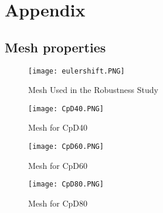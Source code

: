 \appendix
\chapter{Appendix}
\section{Mesh properties}
	\begin{figure}[htp]
		\centering
		\texttt{[image: eulershift.PNG]}
		\caption{Mesh Used in the Robustness Study}
		\label{fig:eulershift}
	\end{figure}  
	\begin{figure}[htp]
		\centering
		\texttt{[image: CpD40.PNG]}
		\caption{Mesh for CpD40}
		\label{fig:ms40}
	\end{figure}
	\begin{figure}[htp]
		\centering
		\texttt{[image: CpD60.PNG]}
		\caption{Mesh for CpD60}
		\label{fig:ms60}
	\end{figure} 
	\begin{figure}[htp]
		\centering
		\texttt{[image: CpD80.PNG]}
		\caption{Mesh for CpD80}
		\label{fig:ms80}
	\end{figure}  